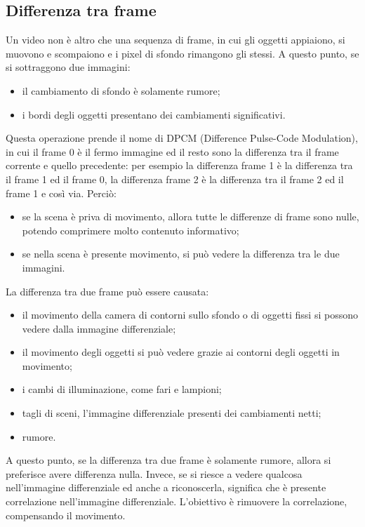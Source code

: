 \subsection{Differenza tra frame}
Un video non è altro che una sequenza di frame, in cui gli oggetti appiaiono, si muovono e scompaiono e i pixel di sfondo rimangono gli stessi. A
questo punto, se si sottraggono due immagini:
\begin{itemize}
    \item il cambiamento di sfondo è solamente rumore;
    \item i bordi degli oggetti presentano dei cambiamenti significativi.
\end{itemize}
Questa operazione prende il nome di DPCM (Difference Pulse-Code Modulation), in cui il frame 0 è il fermo immagine ed il resto sono la differenza
tra il frame corrente e quello precedente: per esempio la differenza frame 1 è la differenza tra il frame 1 ed il frame 0, la differenza frame 2 è la 
differenza tra il frame 2 ed il frame 1 e così via. Perciò:
\begin{itemize}
    \item se la scena è priva di movimento, allora tutte le differenze di frame sono nulle, potendo comprimere molto contenuto informativo;
    \item se nella scena è presente movimento, si può vedere la differenza tra le due immagini.
\end{itemize}
La differenza tra due frame può essere causata:
\begin{itemize}
    \item il movimento della camera di contorni sullo sfondo o di oggetti fissi si possono vedere dalla immagine differenziale;
    \item il movimento degli oggetti si può vedere grazie ai contorni degli oggetti in movimento;
    \item i cambi di illuminazione, come fari e lampioni;
    \item tagli di sceni, l'immagine differenziale presenti dei cambiamenti netti;
    \item rumore.
\end{itemize}
A questo punto, se la differenza tra due frame è solamente rumore, allora si preferisce avere differenza nulla. Invece, se si riesce a vedere qualcosa
nell'immagine differenziale ed anche a riconoscerla, significa che è presente correlazione nell'immagine differenziale. L'obiettivo è rimuovere la
correlazione, compensando il movimento.
